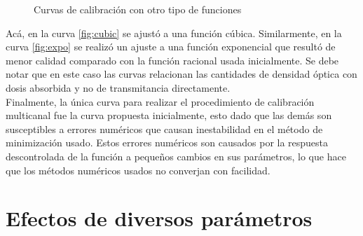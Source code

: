 \begin{figure}[H]
	\centering
	\hfill
	\caption{Curvas de calibración con otro tipo de funciones}
	\label{fig:CurvasAdicionales}
\end{figure}

Acá, en la curva \ref{fig:cubic} se ajustó a una función cúbica. Similarmente, en la curva \ref{fig:expo} se realizó un ajuste a una función exponencial que resultó de menor calidad comparado con la función racional usada inicialmente. Se debe notar que en este caso las curvas relacionan las cantidades  de densidad óptica con dosis absorbida y no de transmitancia directamente.\\

Finalmente, la única curva para realizar el  procedimiento de calibración multicanal fue la curva propuesta inicialmente, esto dado que las demás son susceptibles a errores numéricos que causan inestabilidad en el método de minimización usado. Estos errores numéricos son causados por la respuesta descontrolada de la función a pequeños cambios en sus parámetros, lo que hace que los métodos numéricos usados no converjan con facilidad.


\section{Efectos de diversos parámetros}

